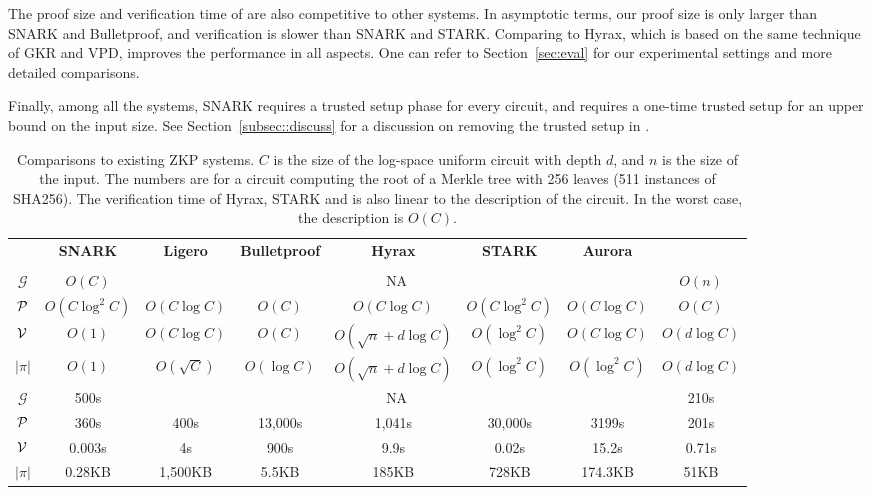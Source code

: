 The proof size and verification time of \name are also competitive to other systems. In asymptotic terms, our proof size is only larger than SNARK and Bulletproof, and verification is slower than SNARK and STARK. Comparing to Hyrax, which is based on the same technique of GKR and VPD, \name improves the performance in all aspects. One can refer to Section~\ref{sec:eval} for our experimental settings and more detailed comparisons. 
 
Finally, among all the systems, SNARK requires a trusted setup phase for every circuit, and \name requires a one-time trusted setup for an upper bound on the input size. See Section~\ref{subsec::discuss} for a discussion on removing the trusted setup in \name. 




\begin{table}[h]
	\centering
	{\fontsize{8}{8}
	\begin{tabular}{|c|c|c|c|c|c|c|c|}
		
		\hline
		&\textbf{SNARK}&\textbf{Ligero}&\textbf{Bulletproof}&\textbf{Hyrax}&\textbf{STARK}&\textbf{Aurora}&\name\\
		&\cite{libsnark}&\cite{ligero}&\cite{bulletproofs}&\cite{hyrax}&\cite{libstark}&\cite{aurora}&\\
		\hline
		\hline
		$\mathcal{G}$&$O(C)$&\multicolumn{5}{c|}{NA}&$O(n)$\\
		\hline
		$\P$&$O(C\log^2C)$&$O(C\log C)$&$O(C)$&$O(C\log C)$&$O(C\log^2 C)$&$O(C\log C)$ &$O(C)$\\
		\hline
		$\V$&$O(1)$&$O(C\log C)$&$O(C)$&$O(\sqrt{n}+d\log C)$&$O(\log^2 C)$&$O(C\log C)$&$O(d\log C)$\\
		\hline
		$|\pi|$&$O(1)$&$O(\sqrt{C})$&$O(\log C)$&$O(\sqrt{n}+d\log C)$&$O(\log^2 C)$& $O(\log^2 C)$&$O(d\log C)$\\
		\hline
		\hline
		$\mathcal{G}$&500s&\multicolumn{5}{c|}{NA}&210s\\
		\hline
		$\P$&360s&400s&13,000s&1,041s&30,000s&3199s&201s\\
		\hline
			$\V$&0.003s&4s&900s&9.9s&0.02s&15.2s&0.71s\\
		\hline
		$|\pi|$&0.28KB&1,500KB&5.5KB&185KB&728KB&174.3KB&51KB\\
		\hline
	\end{tabular}
}

\caption{Comparisons to existing ZKP systems. $C$ is the size of the log-space uniform circuit with depth $d$, and $n$ is the size of the input. The numbers are for a circuit computing the root of a Merkle tree with 256 leaves (511 instances of SHA256). The verification time of Hyrax, STARK and \name is also linear to the description of the circuit. In the worst case, the description is $O(C)$.\protect\footnotemark}\label{tab:zkpall}

\end{table}


